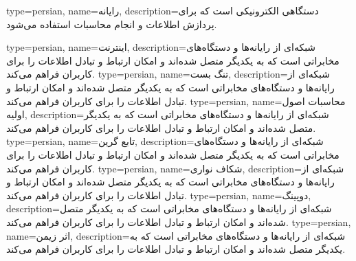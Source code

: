 {
    type=persian,
    name={رایانه},
    description={دستگاهی الکترونیکی است که برای پردازش اطلاعات و انجام محاسبات استفاده می‌شود.}
}

{
    type=persian,
    name={اینترنت},
    description={شبکه‌ای از رایانه‌ها و دستگاه‌های مخابراتی است که به یکدیگر متصل شده‌اند و امکان ارتباط و تبادل اطلاعات را برای کاربران فراهم می‌کند.}
}
{
    type=persian,
    name={تنگ بست},
    description={شبکه‌ای از رایانه‌ها و دستگاه‌های مخابراتی است که به یکدیگر متصل شده‌اند و امکان ارتباط و تبادل اطلاعات را برای کاربران فراهم می‌کند.}
}
{
    type=persian,
    name={محاسبات اصول اولیه},
    description={شبکه‌ای از رایانه‌ها و دستگاه‌های مخابراتی است که به یکدیگر متصل شده‌اند و امکان ارتباط و تبادل اطلاعات را برای کاربران فراهم می‌کند.}
}
{
    type=persian,
    name={تابع گرین},
    description={شبکه‌ای از رایانه‌ها و دستگاه‌های مخابراتی است که به یکدیگر متصل شده‌اند و امکان ارتباط و تبادل اطلاعات را برای کاربران فراهم می‌کند.}
}
{
    type=persian,
    name={شکاف نواری},
    description={شبکه‌ای از رایانه‌ها و دستگاه‌های مخابراتی است که به یکدیگر متصل شده‌اند و امکان ارتباط و تبادل اطلاعات را برای کاربران فراهم می‌کند.}
}
{
    type=persian,
    name={دوپینگ},
    description={شبکه‌ای از رایانه‌ها و دستگاه‌های مخابراتی است که به یکدیگر متصل شده‌اند و امکان ارتباط و تبادل اطلاعات را برای کاربران فراهم می‌کند.}
}
{
    type=persian,
    name={اثر زیمن},
    description={شبکه‌ای از رایانه‌ها و دستگاه‌های مخابراتی است که به یکدیگر متصل شده‌اند و امکان ارتباط و تبادل اطلاعات را برای کاربران فراهم می‌کند.}
}

